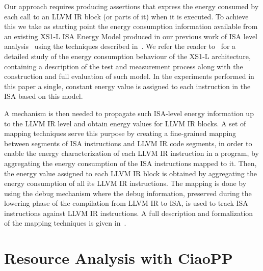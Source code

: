 \documentclass{llncs}
\newcommand{\level}{level\xspace}
\newcommand{\llvmir}{LLVM IR\xspace}
\begin{document}
Our approach requires producing assertions that express the energy
consumed by each call to an \llvmir block (or parts of it) when it is
executed. To achieve this we take as starting point the energy
consumption information available from an existing XS1-L ISA Energy
Model produced in our previous work of ISA level analysis~\cite{isa-energy-lopstr13-final}
using the techniques described in~\cite{Kerrison13}. 
We refer the reader to~\cite{Kerrison13} for a detailed study
of the energy consumption behaviour of the XS1-L architecture,
containing a description of the test and measurement process along
with the construction and full evaluation of such model. In the
experiments performed in this paper a single, constant energy value is
assigned to each instruction in the ISA based on this model.

A mechanism is then needed to propagate such ISA-\level energy
information up to the \llvmir \level and obtain energy values for
\llvmir blocks. A set of mapping techniques serve this purpose by
creating a fine-grained mapping between segments of ISA instructions
and \llvmir code segments, in order to enable the energy
characterization of each \llvmir instruction in a program, by
aggregating the energy consumption of the ISA instructions mapped to
it. Then, the energy value assigned to each \llvmir block is obtained
by aggregating the energy consumption of all its \llvmir
instructions. The mapping is done by using the debug mechanism 
where the debug information, preserved during the lowering phase 
of the compilation from \llvmir to ISA, is used to track ISA instructions 
against \llvmir instructions. A full description and formalization of the mapping techniques 
is given in~\cite{Georgiou2015arXiv}.

\section{Resource Analysis with CiaoPP} 
\label{sec:ciaopp-analysis}
\end{document}
